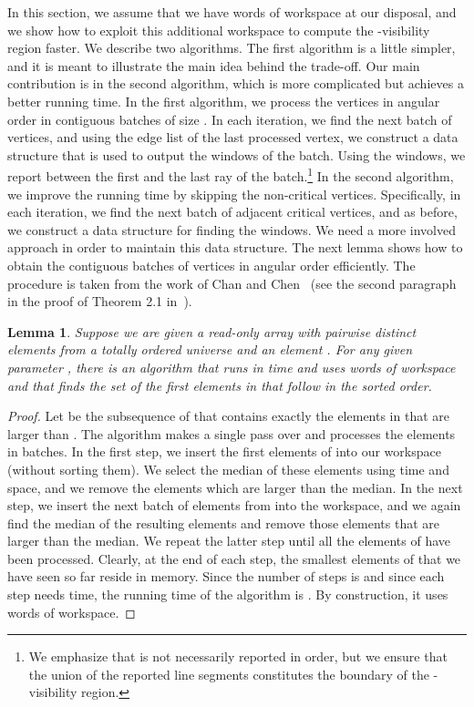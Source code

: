 \documentclass[11pt, a4paper]{article}
\newtheorem{lem}[theorem1]{Lemma}{\bfseries}{\itshape}
\begin{document}
In this section, we assume that we have  words of workspace 
at our disposal, and we show how to exploit this additional 
workspace to compute the -visibility region faster. We describe 
two algorithms. The first algorithm is a little simpler, and it is meant to 
illustrate the main idea behind the trade-off. Our main contribution 
is in the second algorithm, which is more complicated but achieves 
a better running time. In the first algorithm, we process the 
vertices in angular order in contiguous batches of size . In each 
iteration, we find the next batch of  vertices, and using the 
edge list of the last processed vertex, we construct a data 
structure that is used to output the windows of the batch. Using the 
windows, we report  between the first and the last 
ray of the batch.\footnote{We emphasize that 
is not necessarily reported in order, but we ensure that the union 
of the reported line segments constitutes the boundary of the
-visibility region.
}
In the second algorithm, we improve the running time by skipping the 
non-critical vertices. Specifically, in each iteration, we find the 
next batch of  adjacent critical vertices, and as before, we 
construct a data structure for finding the windows. We need a more 
involved approach in order to maintain this data structure. 
The next lemma shows how to obtain the contiguous batches of 
vertices in angular order efficiently.  The procedure is taken  
from the work of Chan and Chen~\cite{chan2007multi} (see the second 
paragraph in the proof of Theorem 2.1 in~\cite{chan2007multi}).

\begin{lem}\label{lem:s-smallest}
Suppose we are given a read-only array  with  pairwise distinct 
elements from a totally ordered universe and an element . For 
any given parameter , there is an 
algorithm that runs in  time and uses  words of workspace 
and that finds the set of the first  elements in  that follow 
 in the sorted order. 
\end{lem}

\begin{proof}
Let  be the subsequence of  that contains exactly the 
elements in  that are larger than .
The algorithm makes a single pass over  and processes the 
elements in batches.
In the first step, we insert the first  elements of  
into our workspace (without sorting them). We select the median 
of these  elements using  time and space, and we remove 
the elements which are larger than the median. In the next step, we 
insert the next batch of  elements from  into the 
workspace, and we again find the median of the resulting  
elements and remove those elements that are larger than the median. 
We repeat the latter step until all the elements of  have 
been processed. Clearly, at the end of each step, the  smallest 
elements of  that we have seen so far reside in memory. 
Since the number of steps is  and since each step needs 
 time, the running time of the 
algorithm is . By construction, it uses  words 
of workspace.
\end{proof}
\end{document}

